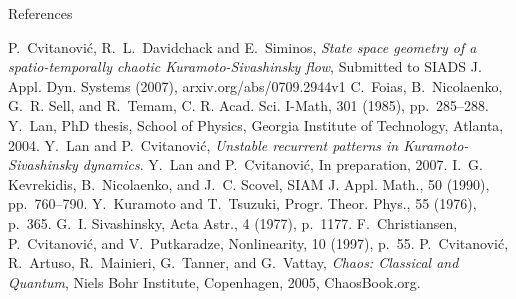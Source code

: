 \documentclass{theo1poster}[2003/04/25]
\begin{document}
\begin{poster}{3}
\begin{sheet}{References}
\begin{thebibliography}{99}
	{\sc P.~Cvitanovi\'c, R.~L.~Davidchack and E.~Siminos},
	\emph{State space geometry of a spatio-temporally chaotic Kuramoto-Sivashinsky flow}, Submitted to
	SIADS J. Appl. Dyn. Systems (2007), arxiv.org/abs/0709.2944v1
{\sc C.~Foias, B.~Nicolaenko, G.~R. Sell, and R.~Temam}, C. R. Acad. Sci. I-Math, 301
  (1985), pp.~285--288.
{\sc Y.~Lan}, PhD thesis, School of Physics, Georgia Institute of
  Technology, Atlanta, 2004.
{\sc Y.~Lan and P.~Cvitanovi\'{c}}, {\em Unstable recurrent patterns in
  {K}uramoto-{S}ivashinsky dynamics}.
{\sc Y.~Lan and P.~Cvitanovi\'{c}}, 
\newblock In preparation, 2007.
{\sc I.~G. Kevrekidis, B.~Nicolaenko, and J.~C. Scovel},  SIAM J. Appl. Math., 50 (1990), pp.~760--790.
{\sc Y.~Kuramoto and T.~Tsuzuki},  Progr. Theor.
  Phys., 55 (1976), p.~365.
{\sc G.~I. Sivashinsky}, Acta Astr., 4
  (1977), p.~1177.
{\sc F.~Christiansen, P.~Cvitanovi\'{c}, and V.~Putkaradze}, Nonlinearity,
  10 (1997), p.~55.
{\sc P.~Cvitanovi\'{c}, R.~Artuso, R.~Mainieri, G.~Tanner, and G.~Vattay}, {\em
  Chaos: Classical and Quantum}, Niels Bohr Institute, Copenhagen, 2005,
  ChaosBook.org.
\end{thebibliography}
\end{sheet}



\end{poster}
\end{document}
